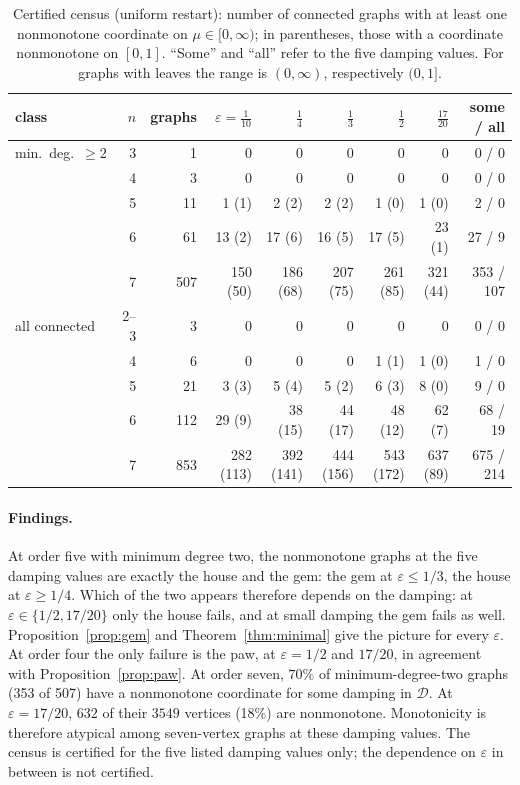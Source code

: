 \documentclass[11pt,a4paper]{article}
\theoremstyle{definition}\newtheorem{conjecture}{Conjecture}
\theoremstyle{remark}\newtheorem{remark}[theorem]{Remark}
\newcommand{\eps}{\varepsilon}
\begin{document}
\begin{table}[htbp]
\centering\small
\caption{Certified census (uniform restart): number of connected graphs with at least one nonmonotone coordinate on $\mu\in[0,\infty)$; in parentheses, those with a coordinate nonmonotone on $[0,1]$. ``Some'' and ``all'' refer to the five damping values. For graphs with leaves the range is $(0,\infty)$, respectively $(0,1]$.}\label{tab:census}
\begin{tabular}{@{}lrrrrrrrr@{}}
\toprule
class & $n$ & graphs & $\eps=\frac1{10}$ & $\frac14$ & $\frac13$ & $\frac12$ & $\frac{17}{20}$ & some / all\\
\midrule
min.\ deg.\ $\geq2$ & 3 & 1 & 0 & 0 & 0 & 0 & 0 & 0 / 0\\
 & 4 & 3 & 0 & 0 & 0 & 0 & 0 & 0 / 0\\
 & 5 & 11 & 1 (1) & 2 (2) & 2 (2) & 1 (0) & 1 (0) & 2 / 0\\
 & 6 & 61 & 13 (2) & 17 (6) & 16 (5) & 17 (5) & 23 (1) & 27 / 9\\
 & 7 & 507 & 150 (50) & 186 (68) & 207 (75) & 261 (85) & 321 (44) & 353 / 107\\
\midrule
all connected & 2--3 & 3 & 0 & 0 & 0 & 0 & 0 & 0 / 0\\
 & 4 & 6 & 0 & 0 & 0 & 1 (1) & 1 (0) & 1 / 0\\
 & 5 & 21 & 3 (3) & 5 (4) & 5 (2) & 6 (3) & 8 (0) & 9 / 0\\
 & 6 & 112 & 29 (9) & 38 (15) & 44 (17) & 48 (12) & 62 (7) & 68 / 19\\
 & 7 & 853 & 282 (113) & 392 (141) & 444 (156) & 543 (172) & 637 (89) & 675 / 214\\
\bottomrule
\end{tabular}
\end{table}

\paragraph{Findings.}
At order five with minimum degree two, the nonmonotone graphs at the five damping values are exactly the house and the gem: the gem at $\eps\leq1/3$, the house at $\eps\geq1/4$. Which of the two appears therefore depends on the damping: at $\eps\in\{1/2,17/20\}$ only the house fails, and at small damping the gem fails as well. Proposition~\ref{prop:gem} and Theorem~\ref{thm:minimal} give the picture for every $\eps$. At order four the only failure is the paw, at $\eps=1/2$ and $17/20$, in agreement with Proposition~\ref{prop:paw}. At order seven, $70\%$ of minimum-degree-two graphs (353 of 507) have a nonmonotone coordinate for some damping in $\mathcal D$. At $\eps=17/20$, $632$ of their $3549$ vertices (18\%) are nonmonotone. Monotonicity is therefore atypical among seven-vertex graphs at these damping values. The census is certified for the five listed damping values only; the dependence on $\eps$ in between is not certified.
\end{document}
